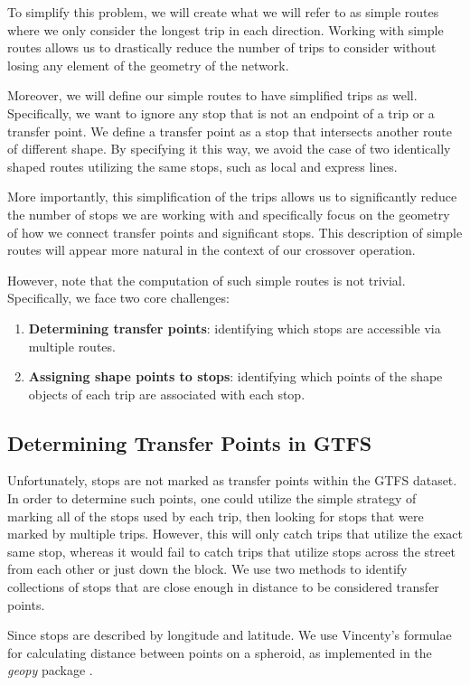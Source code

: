 \documentclass[11pt]{amsart}
\theoremstyle{definition}                  %
\theoremstyle{remark}                       %
\numberwithin{equation}{section}
\begin{document}
To simplify this problem, we will create what we will refer to as simple routes where we only consider the longest trip in each direction. Working with simple routes allows us to drastically reduce the number of trips to consider without losing any element of the geometry of the network.  

Moreover, we will define our simple routes to have simplified trips as well. Specifically, we want to ignore any stop that is not an endpoint of a trip or a transfer point. We define a transfer point as a stop that intersects another route of different shape. By specifying it this way, we avoid the case of two identically shaped routes utilizing the same stops, such as local and express lines.

More importantly, this simplification of the trips allows us to significantly reduce the number of stops we are working with and specifically focus on the geometry of how we connect transfer points and significant stops. This description of simple routes will appear more natural in the context of our crossover operation. 

However, note that the computation of such simple routes is not trivial. Specifically, we face two core challenges:
\begin{enumerate}
    \item \textbf{Determining transfer points}: identifying which stops are accessible via multiple routes. 
    \item \textbf{Assigning shape points to stops}: identifying which points of the shape objects of each trip are associated with each stop. 
\end{enumerate}

\subsection{Determining Transfer Points in GTFS} Unfortunately, stops are not marked as transfer points within the GTFS dataset. In order to determine such points, one could utilize the simple strategy of marking all of the stops used by each trip, then looking for stops that were marked by multiple trips. However, this will only catch trips that utilize the exact same stop, whereas it would fail to catch trips that utilize stops across the street from each other or just down the block. We use two methods to identify collections of stops that are close enough in distance to be considered transfer points. 

Since stops are described by longitude and latitude. We use Vincenty's formulae for calculating distance between points on a spheroid, as implemented in the \textit{geopy} package \cite{geopy}. 
\end{document}
